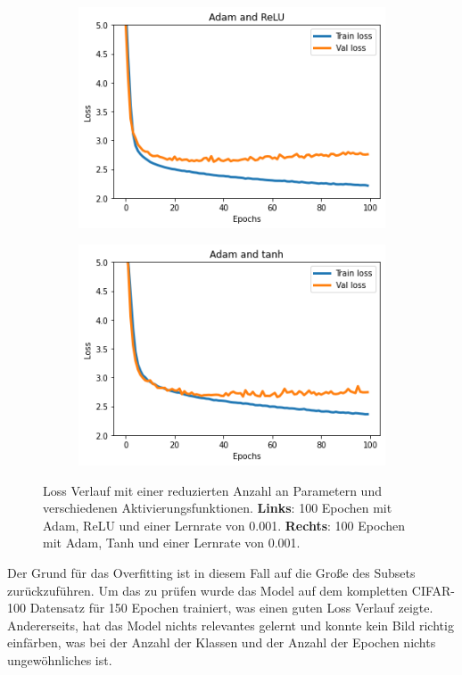 \begin{figure}[H]
  \centering
  \vspace{1cm}
  \begin{subfigure}
    \centering
    \includegraphics[width=.48\textwidth]{resources/experiments/cifar-adam-relu.png}
  \end{subfigure}
  \begin{subfigure}
    \centering
    \includegraphics[width=.48\textwidth]{resources/experiments/cifar-adam-tanh-100.png}
  \end{subfigure}

  \caption{Loss Verlauf mit einer reduzierten Anzahl an Parametern und verschiedenen Aktivierungsfunktionen. 
  \textbf{Links}: 100 Epochen mit Adam, ReLU und einer Lernrate von 0.001. \textbf{Rechts}: 100 Epochen mit Adam, Tanh und einer Lernrate von 0.001.}
  \label{image:gute-ergebnisse-cifar}
\end{figure}

Der Grund für das Overfitting ist in diesem Fall auf die Große des Subsets zurückzuführen. Um das zu prüfen wurde das Model auf dem kompletten CIFAR-100
Datensatz für 150 Epochen trainiert, was einen guten Loss Verlauf zeigte. Andererseits, hat das Model nichts relevantes gelernt und 
konnte kein Bild richtig einfärben, was bei der Anzahl der Klassen und der Anzahl der Epochen nichts ungewöhnliches ist.

